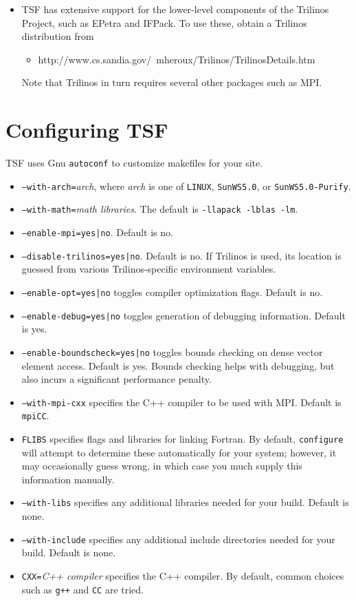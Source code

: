 \documentclass[10pt]{article}
\begin{document}
\begin{itemize}
\item TSF has extensive support for the lower-level components of the Trilinos Project, 
such as EPetra and IFPack. To use these, obtain a Trilinos distribution from 
\begin{itemize}
\item http://www.cs.sandia.gov/~mheroux/Trilinos/TrilinosDetails.htm
\end{itemize}
Note that Trilinos in turn requires several other packages such as MPI. 
\end{itemize}

\section{Configuring TSF}

TSF uses Gnu {\tt autoconf} to customize makefiles for your site. 

\begin{itemize}
\item {\tt --with-arch=}{\it arch}, where {\it arch} is one of {\tt LINUX}, 
{\tt SunWS5.0}, or {\tt SunWS5.0-Purify}.
\item {\tt --with-math=}{\it math libraries}. The default is {\tt -llapack -lblas -lm}.
\item {\tt --enable-mpi=yes|no}. Default is no. 
\item {\tt --disable-trilinos=yes|no}. Default is no. If Trilinos is used, its location
is guessed from various Trilinos-specific environment variables.
\item {\tt --enable-opt=yes|no} toggles compiler optimization flags. Default is
no. 
\item {\tt --enable-debug=yes|no} toggles generation of debugging information. 
Default is yes. 
\item {\tt --enable-boundscheck=yes|no} toggles bounds checking on dense vector 
element access. Default is yes. Bounds checking helps with debugging, but also incurs 
a significant performance penalty. 
\item {\tt --with-mpi-cxx} specifies the C++ compiler to be used with MPI. Default is
{\tt mpiCC}. 
\item {\tt FLIBS} specifies flags and libraries for linking Fortran. By default,
{\tt configure} will attempt to determine these automatically for your system; however,
it may occasionally guess wrong, in which case you much supply this information
manually. 
\item {\tt --with-libs} specifies any additional libraries needed for your build. Default
is none.
\item {\tt --with-include} specifies any additional include directories
needed for your build. Default is none.
\item {\tt CXX=}{\it C++ compiler} specifies the C++ compiler. By default, common choices
such as {\tt g++} and {\tt CC} are tried. 
\end{itemize}
\end{document}
